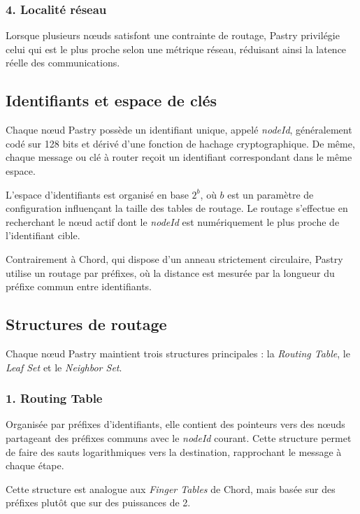 \subsubsection*{4. Localité réseau}
Lorsque plusieurs nœuds satisfont une contrainte de routage, Pastry privilégie celui qui est le plus proche selon une métrique réseau, réduisant ainsi la latence réelle des communications.

\subsection{Identifiants et espace de clés}

Chaque nœud Pastry possède un identifiant unique, appelé \textit{nodeId}, généralement codé sur 128 bits et dérivé d’une fonction de hachage cryptographique. De même, chaque message ou clé à router reçoit un identifiant correspondant dans le même espace.

L’espace d’identifiants est organisé en base $2^{b}$, où $b$ est un paramètre de configuration influençant la taille des tables de routage. Le routage s’effectue en recherchant le nœud actif dont le \textit{nodeId} est numériquement le plus proche de l’identifiant cible.

Contrairement à Chord, qui dispose d’un anneau strictement circulaire, Pastry utilise un routage par préfixes, où la distance est mesurée par la longueur du préfixe commun entre identifiants.

\subsection{Structures de routage}

Chaque nœud Pastry maintient trois structures principales : la \textit{Routing Table}, le \textit{Leaf Set} et le \textit{Neighbor Set}.

\subsubsection{1. Routing Table}

Organisée par préfixes d’identifiants, elle contient des pointeurs vers des nœuds partageant des préfixes communs avec le \textit{nodeId} courant. Cette structure permet de faire des sauts logarithmiques vers la destination, rapprochant le message à chaque étape.

Cette structure est analogue aux \textit{Finger Tables} de Chord, mais basée sur des préfixes plutôt que sur des puissances de 2.

